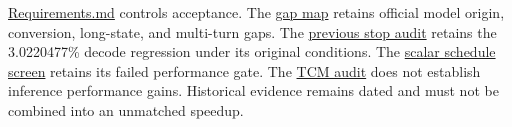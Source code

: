 \documentclass[10pt,a4paper]{article}
\begin{document}
\href{https://github.com/MoyaMryia/riscv-accl/blob/main/Requirements.md}{Requirements.md}
controls acceptance. The
\href{https://github.com/MoyaMryia/riscv-accl/blob/main/spacemit/reports/2026-10-13-requirements-gap.md}{gap
map} retains official model origin, conversion, long-state, and
multi-turn gaps. The
\href{https://github.com/MoyaMryia/riscv-accl/blob/main/spacemit/reports/2026-10-12-combined-stop-audit.md}{previous
stop audit} retains the 3.0220477\% decode regression under its original
conditions. The
\href{https://github.com/MoyaMryia/riscv-accl/blob/main/spacemit/reports/2026-10-13-k1-live-inspect-and-scalar-schedule.md}{scalar
schedule screen} retains its failed performance gate. The
\href{https://github.com/MoyaMryia/riscv-accl/blob/main/spacemit/reports/2026-10-13-k1-tcm-access.md}{TCM
audit} does not establish inference performance gains. Historical
evidence remains dated and must not be combined into an unmatched
speedup.
\end{document}
